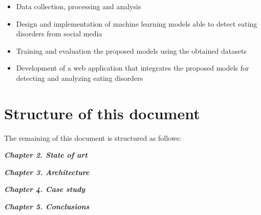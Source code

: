 \begin{itemize}
    \item Data collection, processing and analysis
    \item Design and implementation of machine learning models able to detect eating disorders from social media
    \item Training and evaluation the proposed models using the obtained datasets
    \item Development of a web application that integrates the proposed models for detecting and analyzing eating disorders
\end{itemize}


\section{Structure of this document}

The remaining of this document is structured as follows:

\textbf{\textit{Chapter 2. State of art}}

\textbf{\textit{Chapter 3. Architecture}} 

\textbf{\textit{Chapter 4. Case study}}

\textbf{\textit{Chapter 5. Conclusions}} 